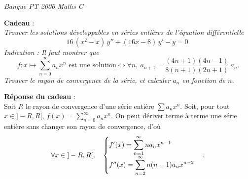 \documentclass[a4paper]{article}
\begin{document}
	\centerline{\textit{Banque PT 2006 Maths C}}

	\bigskip
	\bigskip
	\bigskip
	\textbf{Cadeau} :\\
	\textsl{Trouver les solutions développables en séries entières de l'équation différentielle \[
		16\,(x^2 - x)\,y'' + (16x - 8)\, y' - y = 0
	.\]
	Indication : Il faut montrer que \[
		f : x \mapsto \sum_{n=0}^\infty  a_n x^n \text{ est une solution} \iff \forall n,\: a_{n+1} = \frac{(4n  +1)(4n - 1)}{8(n+1)(2n+1)}\: a_n
	.\]Trouver le rayon de convergence de la série, et calculer $a_n$\/ en fonction de $n$.}

	\bigskip
	\bigskip
	\textbf{Réponse du cadeau} :\\
	Soit $R$\/ le rayon de convergence d'une série entière $\sum a_n x^n$.
	Soit, pour tout $x \in {]-R,R[}$, $f(x) = \sum_{n=0}^\infty a_n x^n$.
On peut dériver terme à terme une série entière sans changer son rayon de convergence, d'où
	\[
		\forall x \in {]-R,R[},\quad \begin{cases}
			f'(x) = \displaystyle\sum_{n=1}^\infty n a_n x^{n-1}\\
			f''(x) = \displaystyle\sum_{n=2}^\infty n(n-1) a_n x^{n-2}\\
		\end{cases}
	.\]
\end{document}
